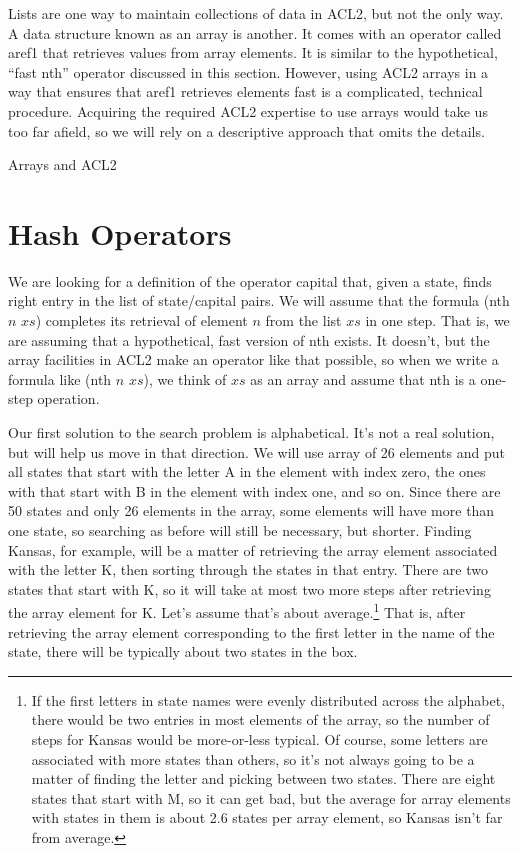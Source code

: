 \begin{aside}
Lists are one way to maintain collections of data in ACL2,
but not the only way. A data structure
known as an array is another. It comes with an operator
called \textsf{aref1} that retrieves values from array elements.
It is similar to the hypothetical, ``fast \textsf{nth}'' operator
discussed in this section. However, using ACL2 arrays in a way that
ensures that \textsf{aref1} retrieves elements fast
is a complicated, technical procedure.
Acquiring the required ACL2 expertise to use arrays
would take us too far afield, so we will rely on a
descriptive approach that omits the details.
\caption{Arrays and ACL2}
\end{aside}

\section{Hash Operators}

We are looking for a definition of the operator
\textsf{capital} that, given a state, finds right entry
in the list of state/capital pairs.
We will assume that the formula \textsf{(nth} $n$ $xs$\textsf{)}
completes its retrieval of element $n$ from the list $xs$
in one step. That is, we are assuming that a hypothetical,
fast version of \textsf{nth} exists. It doesn't, but the
array facilities in ACL2 make an operator like that possible,
so when we write a formula like 
\textsf{(nth} $n$ $xs$\textsf{)}, 
we think of $xs$ as an array and assume that
\textsf{nth} is a one-step operation.

Our first solution to the search problem is alphabetical.
It's not a real solution, but will help us move in that direction.
We will use array of 26 elements
and put all states that start with the letter A in
the element with index zero,
the ones with that start with B in the element with index one, and so on.
Since there are 50 states and only
26 elements in the array, some elements will have more than one state,
so searching as before will still be necessary, but shorter.
Finding Kansas, for example, will be
a matter of retrieving the array element associated with
the letter K, then sorting through the states in that entry.
There are two states that start with K,
so it will take at most two more steps after retrieving
the array element for K.  Let's assume that's about
average.\footnote{If the first letters in state names
were evenly distributed across the alphabet, there would be
two entries in most elements of the array, so the number of steps
for Kansas would be more-or-less typical.
Of course, some letters are associated with more states than
others, so it's not always going to be a matter of finding
the letter and picking between two states. There are eight
states that start with M, so it can get bad,
but the average for array elements with states in them
is about 2.6 states per array element, so
Kansas isn't far from average.}
That is, after retrieving the array element corresponding to
the first letter in the name of the state, there will
be typically about two states in the box.

